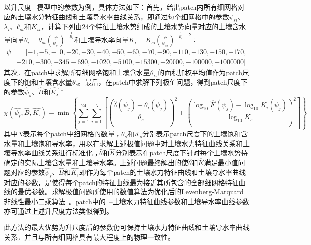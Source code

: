 以升尺度~\citet{campbell1974} 模型中的参数为例，具体方法如下：首先，给出patch内所有细网格对应的土壤水分特征曲线和土壤导水率曲线关系，即通过每个细网格中的参数$\psi_{si}$、$\lambda_{i}$、$\theta_{si}$和$K_{si}$，计算下列由24个特征土壤水势组成的土壤水势向量对应的土壤含水量向量$\theta_i=\theta_{si}\left(\frac{\psi}{\psi_{si}}\right)^{-\frac{1}{B_{i}}}$和土壤导水率向量$K_i=K_{si}\left(\frac{\psi}{\psi_{si}}\right)^{-\frac{3}{B_{i}}-2}$：
\begin{equation}
\begin{aligned}
\psi&=[-1,-5,-10,-20,-30,-40,-50,-60,-70,-90,-110,-130,-150,-170,\\
&-210,-300,-345  -690,-1020,-5100,-15300,-20000,-100000,-1000000]
\end{aligned}
\end{equation}
其次，在patch中求解所有细网格饱和土壤含水量$\theta_{si}$的面积加权平均值作为patch尺度下的饱和土壤含水量$\theta_s$。最后，在patch中求解下列极值问题，得到patch尺度下的参数$\hat{\psi}_{s}$、$\hat{B}$和$\hat{K_s}$：
\begin{equation}
\chi\left(\hat{\psi_s}, \hat{B}, \hat{K_s}\right)=\min\left\{ \sum_{j=1}^{24}\sum_{i=1}^{N}\left[\left(\frac{\hat{\theta}\left(\psi_j\right)-\theta_i\left(\psi_j\right)}{\theta_s}\right)^2
+\left(\frac{\log_{10}\hat{K}\left(\psi_j\right)-\log_{10}K_i\left(\psi_j\right)}{\log_{10}K_s}\right)^2\right]\right\}
\end{equation}
其中$N$表示每个patch中细网格的数量；$\theta_s$和$K_s$分别表示patch尺度下的土壤饱和含水量和土壤饱和导水率，用以在求解上述极值问题中对土壤水力特征曲线关系和土壤导水率曲线关系进行标准化；$\hat{\theta}$和$\hat{K}$分别表示在patch尺度下针对每个土壤水势待确定的实际土壤含水量和土壤导水率。上述问题最终解出的使$\hat{\theta}$和$\hat{K}$满足最小值问题对应的参数$\hat{\psi}_{s}$、$\hat{B}$和$\hat{K_s}$即作为每个patch的土壤水力特征曲线和土壤导水率曲线对应的参数，是使得每个patch的特征曲线最为接近其所包含的全部细网格特征曲线的最优参数。求解极值问题所使用的数值算法为优化后的Levenberg-Marquard非线性最小二乘算法~\citep{Montzka2017scale}。patch中的~\citet{van1980closed}--\citet{mualem1976new}土壤水力特征曲线参数和土壤导水率曲线参数亦可通过上述升尺度方法类似得到。

此方法的最大优势为升尺度后的参数仍可保持土壤水力特征曲线和土壤导水率曲线关系，并且与所有细网格具有最大程度上的物理一致性。